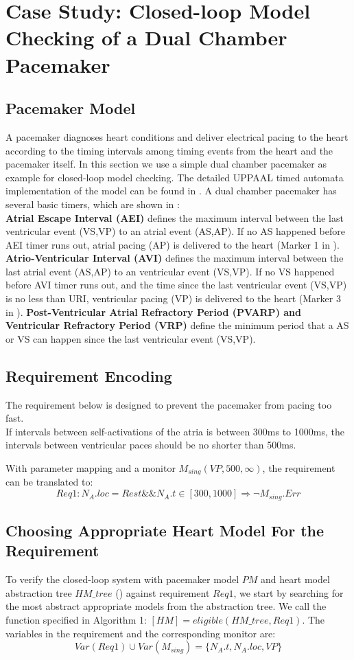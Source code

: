 \section{Case Study: Closed-loop Model Checking of a Dual Chamber Pacemaker}
\label{caseStudy}
\subsection{Pacemaker Model}
A pacemaker diagnoses heart conditions and deliver electrical pacing to the heart according to the timing intervals among timing events from the heart and the pacemaker itself. In this section we use a simple dual chamber pacemaker as example for closed-loop model checking. The detailed UPPAAL timed automata implementation of the model can be found in \cite{sttt13}. A dual chamber pacemaker has several basic timers, which are shown in :\\
\textbf{Atrial Escape Interval (AEI)} defines the maximum interval between the last ventricular event (VS,VP) to an atrial event (AS,AP). If no AS happened before AEI timer runs out, atrial pacing (AP) is delivered to the heart (Marker 1 in ). \\
\textbf{Atrio-Ventricular Interval (AVI)} defines the maximum interval between the last atrial event (AS,AP) to an ventricular event (VS,VP). If no VS happened before AVI timer runs out, and the time since the last ventricular event (VS,VP) is no less than URI, ventricular pacing (VP) is delivered to the heart (Marker 3 in ).
\textbf{Post-Ventricular Atrial Refractory Period (PVARP) and Ventricular Refractory Period (VRP)} define the minimum period that a AS or VS can happen since the last ventricular event (VS,VP). 

\subsection{Requirement Encoding}
The requirement below is designed to prevent the pacemaker from pacing too fast.\\
\textsf{If intervals between self-activations of the atria is between 300ms to 1000ms, the intervals between ventricular paces should be no shorter than 500ms.}

With parameter mapping and a monitor $M_{sing}(VP,500,\infty)$, the requirement can be translated to:
$$Req1: N_A.loc=Rest \&\& N_A.t\in [300,1000] \Rightarrow \neg M_{sing}.Err$$

 \subsection{Choosing Appropriate Heart Model For the Requirement}
To verify the closed-loop system with pacemaker model $PM$ and heart model abstraction tree $HM\_tree$ () against requirement $Req1$, we start by searching for the most abstract appropriate models from the abstraction tree. We call the function specified in Algorithm 1: $[HM]=eligible(HM\_tree,Req1)$. The variables in the requirement and the corresponding monitor are:
$$Var(Req1)\cup Var(M_{sing})=\{N_A.t,N_A.loc, VP\}$$

